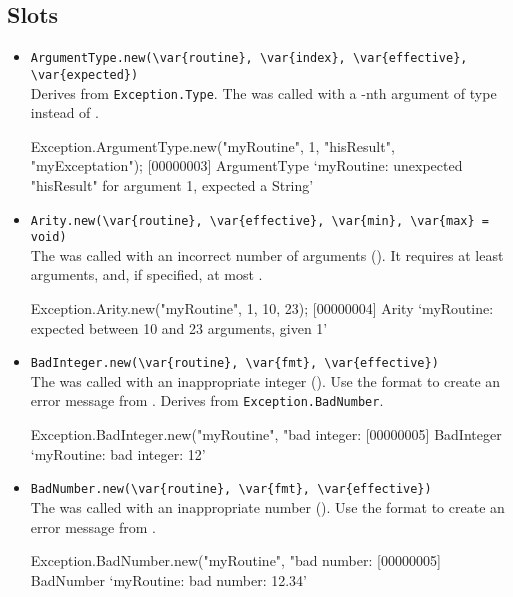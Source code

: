 \subsection{Slots}
\begin{itemize}
\item \lstinline|ArgumentType.new(\var{routine}, \var{index}, \var{effective}, \var{expected})|\\
  Derives from \lstinline|Exception.Type|.  The  was
  called with a -nth argument of type 
  instead of .
\begin{urbiscript}
Exception.ArgumentType.new("myRoutine", 1, "hisResult", "myExceptation");
[00000003] ArgumentType `myRoutine: unexpected "hisResult" for argument 1, expected a String'
\end{urbiscript}

\item \lstinline|Arity.new(\var{routine}, \var{effective}, \var{min}, \var{max} = void)|\\
  The  was called with an incorrect number of arguments
  ().  It requires at least  arguments, and,
  if specified, at most .
\begin{urbiscript}
Exception.Arity.new("myRoutine", 1, 10, 23);
[00000004] Arity `myRoutine: expected between 10 and 23 arguments, given 1'
\end{urbiscript}

\item \lstinline|BadInteger.new(\var{routine}, \var{fmt}, \var{effective})|\\
  The  was called with an inappropriate integer
  ().  Use the format  to create an error
  message from .  Derives from
  \lstinline|Exception.BadNumber|.
\begin{urbiscript}
Exception.BadInteger.new("myRoutine", "bad integer: %
[00000005] BadInteger `myRoutine: bad integer: 12'
\end{urbiscript}

\item \lstinline|BadNumber.new(\var{routine}, \var{fmt}, \var{effective})|\\
  The  was called with an inappropriate number
  ().  Use the format  to create an error
  message from .
\begin{urbiscript}
Exception.BadNumber.new("myRoutine", "bad number: %
[00000005] BadNumber `myRoutine: bad number: 12.34'
\end{urbiscript}


\end{itemize}
